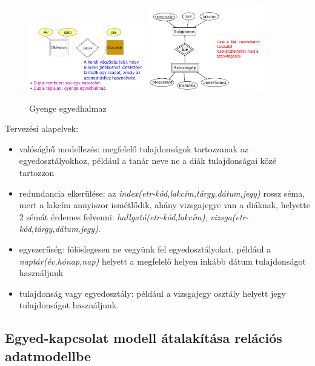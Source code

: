 \documentclass[margin=0px]{article}
\begin{document}
	\begin{figure}[H]
		\centering
		\includegraphics[width=0.45\textwidth]{img/ek5.png}
		\includegraphics[width=0.45\textwidth]{img/ek6.png}
		\caption{Gyenge egyedhalmaz}
	\end{figure}
	Tervezési alapelvek:
	\begin{itemize}
		\item valósághű modellezés: megfelelő tulajdonságok tartozzanak az egyedosztályokhoz, például a tanár neve ne a diák tulajdonságai közé tartozzon
		\item redundancia elkerülése: az \textit{index(etr-kód,lakcím,tárgy,dátum,jegy)} rossz séma,
		mert a lakcím annyiszor ismétlődik, ahány vizsgajegye van a diáknak, helyette 2 sémát érdemes felvenni: \textit{hallgató(etr-kód,lakcím)}, \textit{vizsga(etr-kód,tárgy,dátum,jegy)}.
		\item egyszerűség: fölöslegesen ne vegyünk fel egyedosztályokat, például a \textit{naptár(év,hónap,nap)} helyett a megfelelő helyen inkább dátum tulajdonságot használjunk
		\item tulajdonság vagy egyedosztály: például a vizsgajegy osztály helyett jegy tulajdonságot
		használjunk.
	\end{itemize}
	
	\subsection{Egyed-kapcsolat modell átalakítása relációs adatmodellbe}
	
\end{document}
